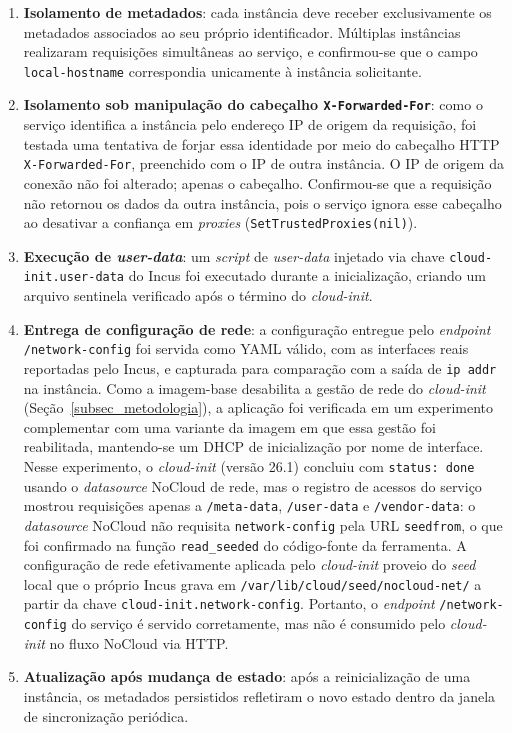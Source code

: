 \begin{enumerate}
    \item \textbf{Isolamento de metadados}: cada instância deve receber exclusivamente os metadados associados ao seu próprio identificador. Múltiplas instâncias realizaram requisições simultâneas ao serviço, e confirmou-se que o campo \texttt{local-hostname} correspondia unicamente à instância solicitante.

    \item \textbf{Isolamento sob manipulação do cabeçalho \texttt{X-Forwarded-For}}: como o serviço identifica a instância pelo endereço IP de origem da requisição, foi testada uma tentativa de forjar essa identidade por meio do cabeçalho HTTP \texttt{X-Forwarded-For}, preenchido com o IP de outra instância. O IP de origem da conexão não foi alterado; apenas o cabeçalho. Confirmou-se que a requisição não retornou os dados da outra instância, pois o serviço ignora esse cabeçalho ao desativar a confiança em \textit{proxies} (\texttt{SetTrustedProxies(nil)}).

    \item \textbf{Execução de \textit{user-data}}: um \textit{script} de \textit{user-data} injetado via chave \texttt{cloud-init.user-data} do Incus foi executado durante a inicialização, criando um arquivo sentinela verificado após o término do \textit{cloud-init}.

    \item \textbf{Entrega de configuração de rede}: a configuração entregue pelo \textit{endpoint} \texttt{/network-config} foi servida como YAML válido, com as interfaces reais reportadas pelo Incus, e capturada para comparação com a saída de \texttt{ip addr} na instância. Como a imagem-base desabilita a gestão de rede do \textit{cloud-init} (Seção~\ref{subsec_metodologia}), a aplicação foi verificada em um experimento complementar com uma variante da imagem em que essa gestão foi reabilitada, mantendo-se um DHCP de inicialização por nome de interface. Nesse experimento, o \textit{cloud-init} (versão 26.1) concluiu com \texttt{status: done} usando o \textit{datasource} NoCloud de rede, mas o registro de acessos do serviço mostrou requisições apenas a \texttt{/meta-data}, \texttt{/user-data} e \texttt{/vendor-data}: o \textit{datasource} NoCloud não requisita \texttt{network-config} pela URL \texttt{seedfrom}, o que foi confirmado na função \texttt{read\_seeded} do código-fonte da ferramenta. A configuração de rede efetivamente aplicada pelo \textit{cloud-init} proveio do \textit{seed} local que o próprio Incus grava em \texttt{/var/lib/cloud/seed/nocloud-net/} a partir da chave \texttt{cloud-init.network-config}. Portanto, o \textit{endpoint} \texttt{/network-config} do serviço é servido corretamente, mas não é consumido pelo \textit{cloud-init} no fluxo NoCloud via HTTP.

    \item \textbf{Atualização após mudança de estado}: após a reinicialização de uma instância, os metadados persistidos refletiram o novo estado dentro da janela de sincronização periódica.
\end{enumerate}

